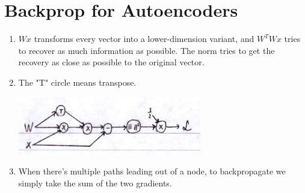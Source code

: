 \documentclass[12pt]{article}
\begin{document}
\section{Backprop for Autoencoders}

\begin{enumerate}[label=(\alph*)]
    \item $Wx$ transforms every vector into a lower-dimension variant,
          and $W^TWx$ tries to recover as much information as possible.
          The norm tries to get the recovery as close as possible to the original vector.

    \item The "T" circle means transpose.
          \begin{center}
              \includegraphics[width=8cm]{img/hw3/autoencoder}
          \end{center}

    \item When there's multiple paths leading out of a node,
          to backpropagate we simply take the sum of the two gradients.


\end{enumerate}
\end{document}
